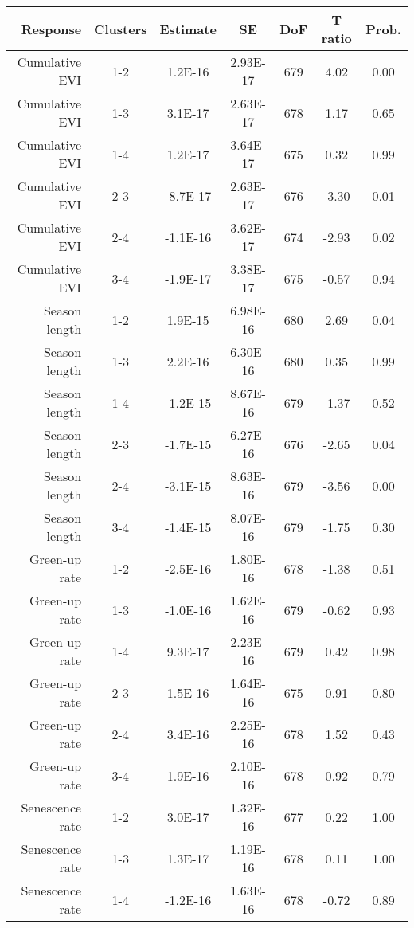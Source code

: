 \begin{table}[H]
\centering
\begin{tabular}{rcccccc}
  \hline
Response & Clusters & Estimate & SE & DoF & T ratio & Prob. \\ 
  \hline
Cumulative EVI & 1-2 & 1.2E-16 & 2.93E-17 & 679 & 4.02 & 0.00 \\ 
  Cumulative EVI & 1-3 & 3.1E-17 & 2.63E-17 & 678 & 1.17 & 0.65 \\ 
  Cumulative EVI & 1-4 & 1.2E-17 & 3.64E-17 & 675 & 0.32 & 0.99 \\ 
   \hline
Cumulative EVI & 2-3 & -8.7E-17 & 2.63E-17 & 676 & -3.30 & 0.01 \\ 
  Cumulative EVI & 2-4 & -1.1E-16 & 3.62E-17 & 674 & -2.93 & 0.02 \\ 
  Cumulative EVI & 3-4 & -1.9E-17 & 3.38E-17 & 675 & -0.57 & 0.94 \\ 
   \hline
Season length & 1-2 & 1.9E-15 & 6.98E-16 & 680 & 2.69 & 0.04 \\ 
  Season length & 1-3 & 2.2E-16 & 6.30E-16 & 680 & 0.35 & 0.99 \\ 
  Season length & 1-4 & -1.2E-15 & 8.67E-16 & 679 & -1.37 & 0.52 \\ 
   \hline
Season length & 2-3 & -1.7E-15 & 6.27E-16 & 676 & -2.65 & 0.04 \\ 
  Season length & 2-4 & -3.1E-15 & 8.63E-16 & 679 & -3.56 & 0.00 \\ 
  Season length & 3-4 & -1.4E-15 & 8.07E-16 & 679 & -1.75 & 0.30 \\ 
   \hline
Green-up rate & 1-2 & -2.5E-16 & 1.80E-16 & 678 & -1.38 & 0.51 \\ 
  Green-up rate & 1-3 & -1.0E-16 & 1.62E-16 & 679 & -0.62 & 0.93 \\ 
  Green-up rate & 1-4 & 9.3E-17 & 2.23E-16 & 679 & 0.42 & 0.98 \\ 
   \hline
Green-up rate & 2-3 & 1.5E-16 & 1.64E-16 & 675 & 0.91 & 0.80 \\ 
  Green-up rate & 2-4 & 3.4E-16 & 2.25E-16 & 678 & 1.52 & 0.43 \\ 
  Green-up rate & 3-4 & 1.9E-16 & 2.10E-16 & 678 & 0.92 & 0.79 \\ 
  Senescence rate & 1-2 & 3.0E-17 & 1.32E-16 & 677 & 0.22 & 1.00 \\ 
  Senescence rate & 1-3 & 1.3E-17 & 1.19E-16 & 678 & 0.11 & 1.00 \\ 
  Senescence rate & 1-4 & -1.2E-16 & 1.63E-16 & 678 & -0.72 & 0.89 \\ 

\end{tabular}
\end{table}
